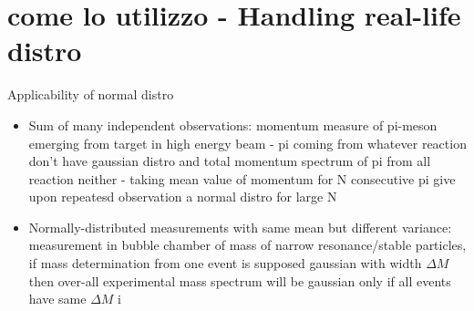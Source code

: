 \documentclass[asd-beamer.tex]{subfiles}%
\begin{document}
\section{come lo utilizzo - Handling real-life distro}

\begin{frame}{Applicability of normal distro}
    \begin{itemize}
        \item Sum of many independent observations: momentum measure of pi-meson emerging from target in high energy beam - pi coming from whatever reaction don't have gaussian distro and total momentum spectrum of pi from all reaction neither - taking mean value of momentum for N consecutive pi give upon repeatesd observation a normal distro for large N
        \item Normally-distributed measurements with same mean but different variance: measurement in bubble chamber of mass of narrow resonance/stable particles, if mass determination from one event is supposed gaussian with width $\Delta M$ then over-all experimental mass spectrum will be gaussian only if all events have same $\Delta M$
i    \end{itemize}
\end{frame}
\end{document}
